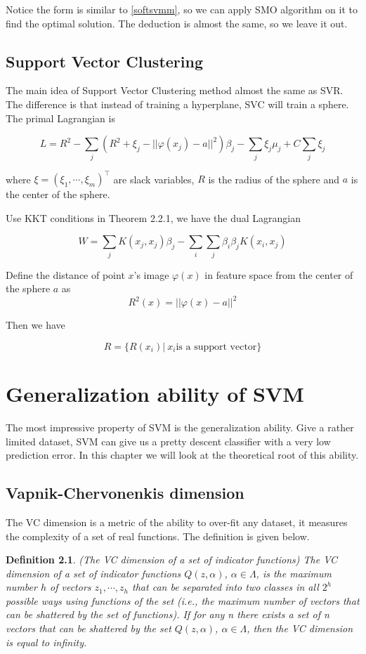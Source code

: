 \documentclass[a4paper]{report}
\newtheorem{definition}{Definition}[section]
\begin{document}
Notice the form is similar to \ref{softsvmm}, so we can apply SMO algorithm on it to find the optimal solution. The deduction is almost the same, so we leave it out.

\section{Support Vector Clustering}

The main idea of Support Vector Clustering method\cite{ben2001support} almost the same as SVR. The difference is that instead of training a hyperplane, SVC will train a sphere. The primal Lagrangian is

\[
    L=R^2-\sum_j (R^2+\xi_j-||\varphi(x_j)-a||^2)\beta_j-\sum_j\xi_j\mu_j+C\sum_j\xi_j
\]

where $\xi=(\xi_1,\cdots,\xi_m)^\top$ are slack variables, $R$ is the radius of the sphere and $a$ is the center of the sphere.

Use KKT conditions in Theorem 2.2.1, we have the dual Lagrangian

\[
    W=\sum_jK(x_j,x_j)\beta_j-\sum_i\sum_j\beta_i\beta_jK(x_i,x_j)
\]

Define the distance of point $x$'s image $\varphi(x)$ in feature space from the center of the sphere $a$ as
\[
    R^2(x)=||\varphi(x)-a||^2
\]

Then we have

\[
    R=\{R(x_i)|\ x_i \text{is a support vector} \}
\]

\chapter{Generalization ability of SVM}

The most impressive property of SVM is the generalization ability. Give a rather limited dataset, SVM can give us a pretty descent classifier with a very low prediction error. In this chapter we will look at the theoretical root of this ability.

\section{Vapnik-Chervonenkis dimension}

The VC dimension is a metric of the ability to over-fit any dataset, it measures the complexity of a set of real functions. The definition is given below.

\begin{definition}
    (The VC dimension of a set of indicator functions\cite{vapnik2013nature}) The VC dimension of a set of indicator functions $Q(z,\alpha)$, $\alpha\in\Lambda$, is the maximum number $h$ of vectors $z_1,\cdots,z_h$ that can be separated into two classes in all $2^h$ possible ways using functions of the set (i.e., the maximum number of vectors that can be shattered by the set of functions). If for any n there exists a set of n vectors that can be shattered by the set
    $Q(z,\alpha)$, $\alpha\in\Lambda$, then the VC dimension is equal to infinity.
\end{definition}
\end{document}
